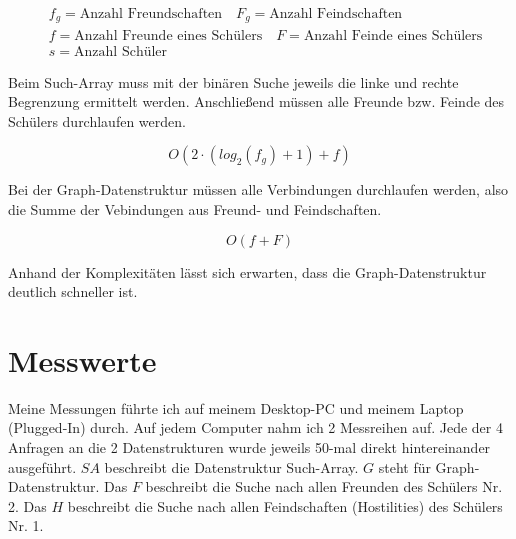 \documentclass[11pt,a4paper]{article}
\begin{document}
\begin{align*}
    & f_g = \text{Anzahl Freundschaften} \quad
    F_g = \text{Anzahl Feindschaften} \\ 
    & f = \text{Anzahl Freunde eines Schülers} \quad
    F = \text{Anzahl Feinde eines Schülers} \\
    & s = \text{Anzahl Schüler} \quad
\end{align*}

Beim Such-Array muss mit der binären Suche jeweils die linke und rechte Begrenzung
ermittelt werden. Anschließend müssen alle Freunde bzw. Feinde des
Schülers durchlaufen werden.

\begin{equation*}
    O(2 \cdot ( log_2(f_g) + 1 ) + f)
\end{equation*}

Bei der Graph-Datenstruktur müssen alle Verbindungen durchlaufen werden, also
die Summe der Vebindungen aus Freund- und Feindschaften.

\begin{equation*}
    O(f + F)
\end{equation*}

Anhand der Komplexitäten lässt sich erwarten, dass die Graph-Datenstruktur deutlich
schneller ist.

\section{Messwerte}

Meine Messungen führte ich auf meinem Desktop-PC und meinem Laptop (Plugged-In) durch.
Auf jedem Computer nahm ich 2 Messreihen auf.
Jede der 4 Anfragen an die 2 Datenstrukturen wurde jeweils 50-mal direkt hintereinander
ausgeführt.
$SA$ beschreibt die Datenstruktur Such-Array. $G$ steht für Graph-Datenstruktur.
Das $F$ beschreibt die Suche nach allen Freunden des Schülers Nr. 2.
Das $H$ beschreibt die Suche nach allen Feindschaften (Hostilities) des Schülers Nr. 1.

\end{document}
